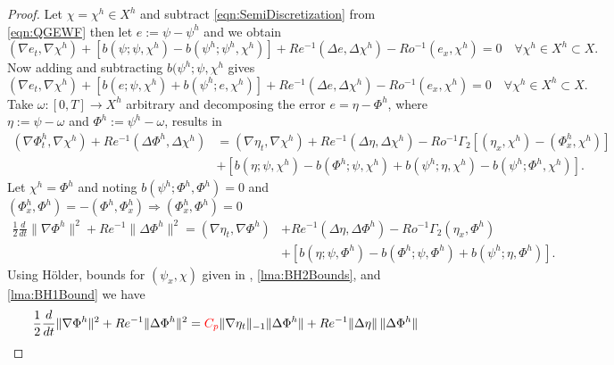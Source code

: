 \begin{proof}
  Let $\chi = \chi^h \in X^h$ and subtract \eqref{eqn:SemiDiscretization} from
  \eqref{eqn:QGEWF} then let $e:=\psi - \psi^h$ and we obtain
  \begin{equation*}
    (\nabla e_t, \nabla \chi^h) + \left[b(\psi;\psi,\chi^h) - b(\psi^h;\psi^h,\chi^h)\right]
      + Re^{-1}(\Delta e, \Delta \chi^h) - Ro^{-1} (e_x, \chi^h) = 0\quad
      \forall \chi^h \in X^h \subset X.
  \end{equation*}
  Now adding and subtracting $b(\psi^h;\psi,\chi^h$ gives
  \begin{equation*}
    (\nabla e_t, \nabla \chi^h) + \left[b(e;\psi,\chi^h) + b(\psi^h;e,\chi^h)\right]
      + Re^{-1}(\Delta e, \Delta \chi^h) - Ro^{-1} (e_x, \chi^h) = 0\quad
      \forall \chi^h \in X^h \subset X.
  \end{equation*}
  Take $\omega:[0,T] \to X^h$ arbitrary and decomposing the error $e = \eta -
  \Phi^h$, where $\eta := \psi - \omega$ and $\Phi^h := \psi^h - \omega$,
  results in
  \begin{align*}
    (\nabla \Phi^h_t, \nabla \chi^h) + Re^{-1}(\Delta \Phi^h, \Delta \chi^h)
      & = (\nabla \eta_t, \nabla \chi^h) + Re^{-1}(\Delta \eta, \Delta \chi^h)
      - Ro^{-1} \Gamma_2 \left[(\eta_x, \chi^h) - (\Phi^h_x, \chi^h)\right] \\
    & + \left[ b(\eta;\psi,\chi^h) - b(\Phi^h;\psi,\chi^h)
      + b(\psi^h;\eta,\chi^h) - b(\psi^h;\Phi^h,\chi^h)\right].
  \end{align*}
  Let $\chi^h = \Phi^h$ and noting $b(\psi^h;\Phi^h,\Phi^h) = 0$ and $(\Phi^h_x,
  \Phi^h) = -(\Phi^h,\Phi^h_x) \Rightarrow (\Phi^h_x,\Phi^h) = 0$
  \begin{align*}
    \frac{1}{2} \frac{d}{dt} \|\nabla \Phi^h\|^2 + Re^{-1}\|\Delta \Phi^h\|^2
       = (\nabla \eta_t, \nabla \Phi^h) &+ Re^{-1}(\Delta \eta, \Delta \Phi^h)
      - Ro^{-1} \Gamma_2 (\eta_x, \Phi^h) \\
    & + \left[ b(\eta;\psi,\Phi^h) - b(\Phi^h;\psi,\Phi^h)
      + b(\psi^h;\eta,\Phi^h)\right].
  \end{align*}
  Using H\"older, bounds for $(\psi_x,\chi)$ given in \cite{Foster},
  \autoref{lma:BH2Bounds}, and \autoref{lma:BH1Bound} we have
  \begin{equation}
    \begin{split}
      \frac{1}{2} \frac{d}{dt} \|\nabla \Phi^h\|^2 + Re^{-1}\|\Delta \Phi^h\|^2
        &= {\color{red} C_p} \|\nabla \eta_t\|_{-1} \|\Delta \Phi^h\|
        + Re^{-1}\|\Delta \eta\|\, \|\Delta \Phi^h\|

\end{split}
\end{equation}
\end{proof}
